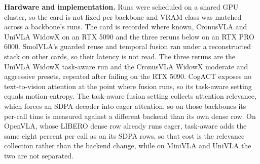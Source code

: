 \documentclass[letterpaper, 10 pt, conference]{ieeeconf}
\begin{document}
\textbf{Hardware and implementation.} Runs were scheduled on a shared GPU
cluster, so the card is not fixed per backbone and VRAM class was matched
across a backbone's runs. The card is recorded where known, CronusVLA and
UniVLA WidowX on an RTX 5090 and the three reruns below on an RTX PRO 6000.
SmolVLA's guarded reuse and temporal fusion ran under
a reconstructed stack on other cards, so their latency is not read. The three reruns are the UniVLA WidowX
task-aware run and the CronusVLA WidowX moderate and aggressive presets,
repeated after failing on the RTX 5090. CogACT exposes no text-to-vision
attention at the point where fusion runs, so its task-aware setting equals
motion-entropy. The task-aware fusion setting collects attention relevance,
which forces an SDPA decoder into eager attention, so on those backbones
its per-call time is measured against a different backend than its own
dense row. On OpenVLA, whose LIBERO dense row already runs eager, task-aware
adds the same eight percent per call as on its SDPA rows, so that cost is
the relevance collection rather than the backend change, while on MiniVLA
and UniVLA the two are not separated.

\begin{table}[t]
\centering
\caption{The seven backbones, their released checkpoints, and how each was run. Parameter counts are as reported by the original works. Decoder depth is the stack that depth pruning acts on. Actions per call is how many environment steps one model call covers.}
\label{tab:backbones}
\small
\setlength{\tabcolsep}{4pt}
\end{table}
\end{document}

